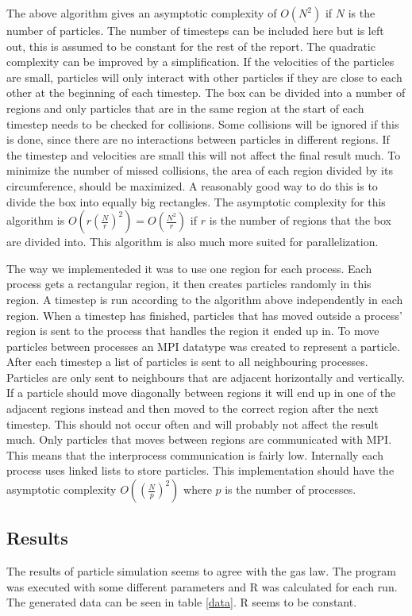 \documentclass[a4paper,11pt]{article}
\begin{document}
The above algorithm gives an asymptotic complexity of $O(N^2)$ if $N$ is the number of particles.
The number of timesteps can be included here but is left out, this is assumed to be constant for the rest of the report.
The quadratic complexity can be improved by a simplification.
If the velocities of the particles are small, particles will only interact with other particles if they are close to each other at the beginning of each timestep.
The box can be divided into a number of regions and only particles that are in the same region at the start of each timestep needs to be checked for collisions.
Some collisions will be ignored if this is done, since there are no interactions between particles in different regions.
If the timestep and velocities are small this will not affect the final result much.
To minimize the number of missed collisions, the area of each region divided by its circumference, should be maximized.
A reasonably good way to do this is to divide the box into equally big rectangles.
The asymptotic complexity for this algorithm is $O(r(\frac{N}{r})^2) = O(\frac{N^2}{r})$ if $r$ is the number of regions that the box are divided into.
This algorithm is also much more suited for parallelization.

The way we implementeded it was to use one region for each process.
Each process gets a rectangular region, it then creates particles randomly in this region.
A timestep is run according to the algorithm above independently in each region.
When a timestep has finished, particles that has moved outside a process' region is sent to the process that handles the region it ended up in.
To move particles between processes an MPI datatype was created to represent a particle.
After each timestep a list of particles is sent to all neighbouring processes.
Particles are only sent to neighbours that are adjacent horizontally and vertically.
If a particle should move diagonally between regions it will end up in one of the adjacent regions instead and then moved to the correct region after the next timestep.
This should not occur often and will probably not affect the result much.
Only particles that moves between regions are communicated with MPI.
This means that the interprocess communication is fairly low.
Internally each process uses linked lists to store particles.
This implementation should have the asymptotic complexity $O((\frac{N}{p})^2)$ where $p$ is the number of processes.

\subsection{Results}
The results of particle simulation seems to agree with the gas law.
The program was executed with some different parameters and R was calculated for each run.
The generated data can be seen in table \ref{data}.
R seems to be constant.
\end{document}

